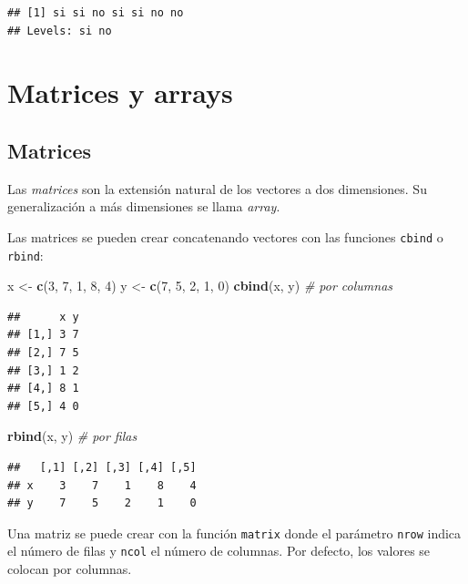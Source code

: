 \documentclass[]{book}
\newenvironment{Shaded}{\begin{snugshade}}{\end{snugshade}}
\newcommand{\CommentTok}[1]{\textcolor[rgb]{0.56,0.35,0.01}{\textit{#1}}}
\newcommand{\DecValTok}[1]{\textcolor[rgb]{0.00,0.00,0.81}{#1}}
\newcommand{\KeywordTok}[1]{\textcolor[rgb]{0.13,0.29,0.53}{\textbf{#1}}}
\newcommand{\NormalTok}[1]{#1}
\newcommand{\StringTok}[1]{\textcolor[rgb]{0.31,0.60,0.02}{#1}}
\begin{document}
\begin{verbatim}
## [1] si si no si si no no
## Levels: si no
\end{verbatim}

\hypertarget{matrices-y-arrays}{%
\section{Matrices y arrays}\label{matrices-y-arrays}}

\hypertarget{matrices}{%
\subsection{Matrices}\label{matrices}}

Las \emph{matrices} son la extensión natural de los vectores a dos dimensiones.
Su generalización a más dimensiones se llama \emph{array}.

Las matrices se pueden crear concatenando vectores
con las funciones \texttt{cbind} o \texttt{rbind}:

\begin{Shaded}
\begin{Highlighting}[]
\NormalTok{x <-}\StringTok{ }\KeywordTok{c}\NormalTok{(}\DecValTok{3}\NormalTok{, }\DecValTok{7}\NormalTok{, }\DecValTok{1}\NormalTok{, }\DecValTok{8}\NormalTok{, }\DecValTok{4}\NormalTok{)}
\NormalTok{y <-}\StringTok{ }\KeywordTok{c}\NormalTok{(}\DecValTok{7}\NormalTok{, }\DecValTok{5}\NormalTok{, }\DecValTok{2}\NormalTok{, }\DecValTok{1}\NormalTok{, }\DecValTok{0}\NormalTok{)}
\KeywordTok{cbind}\NormalTok{(x, y)  }\CommentTok{# por columnas}
\end{Highlighting}
\end{Shaded}

\begin{verbatim}
##      x y
## [1,] 3 7
## [2,] 7 5
## [3,] 1 2
## [4,] 8 1
## [5,] 4 0
\end{verbatim}

\begin{Shaded}
\begin{Highlighting}[]
\KeywordTok{rbind}\NormalTok{(x, y)  }\CommentTok{# por filas}
\end{Highlighting}
\end{Shaded}

\begin{verbatim}
##   [,1] [,2] [,3] [,4] [,5]
## x    3    7    1    8    4
## y    7    5    2    1    0
\end{verbatim}

Una matriz se puede crear con la función \texttt{matrix} donde el parámetro
\texttt{nrow} indica el número de filas y \texttt{ncol} el número de columnas.
Por defecto, los valores se colocan por columnas.
\end{document}

